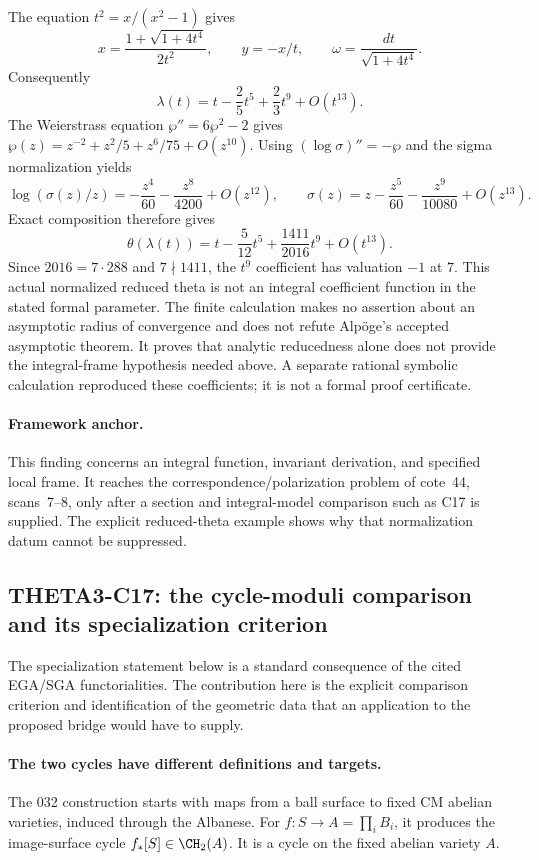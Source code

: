 \documentclass[11pt]{article}
\theoremstyle{definition}\newtheorem{definition}[theorem]{Definition}\newtheorem{remark}[theorem]{Remark}
\begin{document}
The equation $t^2=x/(x^2-1)$ gives
\[
 x=\frac{1+\sqrt{1+4t^4}}{2t^2},\qquad y=-x/t,
 \qquad \omega=\frac{dt}{\sqrt{1+4t^4}}.
\]
Consequently
\[
 \lambda(t)=t-\frac25t^5+\frac23t^9+O(t^{13}).
\]
The Weierstrass equation $\wp''=6\wp^2-2$ gives
$\wp(z)=z^{-2}+z^2/5+z^6/75+O(z^{10})$.
Using $(\log\sigma)''=-\wp$ and the sigma normalization yields
\[
 \log(\sigma(z)/z)=-\frac{z^4}{60}-\frac{z^8}{4200}+O(z^{12}),
 \qquad
 \sigma(z)=z-\frac{z^5}{60}-\frac{z^9}{10080}+O(z^{13}).
\]
Exact composition therefore gives
\[
 \theta(\lambda(t))
 =t-\frac5{12}t^5+\frac{1411}{2016}t^9+O(t^{13}).
\]
Since $2016=7\cdot288$ and $7\nmid1411$, the $t^9$ coefficient
has valuation $-1$ at $7$. This actual normalized reduced theta is
not an integral coefficient function in the stated formal
parameter. The finite calculation makes no assertion about an
asymptotic radius of convergence and does not refute Alp\"oge's
accepted asymptotic theorem. It proves that analytic reducedness
alone does not provide the integral-frame hypothesis needed above.
A separate rational symbolic calculation reproduced these
coefficients; it is not a formal proof certificate.

\paragraph{Framework anchor.}
This finding concerns an integral function, invariant derivation, and
specified local frame.  It reaches the correspondence/polarization
problem of cote~44, scans~7--8, only after a section and integral-model
comparison such as C17 is supplied.  The explicit reduced-theta example
shows why that normalization datum cannot be suppressed.

\subsection{THETA3-C17: the cycle-moduli comparison and its specialization criterion}
\label{C17}

The specialization statement below is a standard consequence of the cited
EGA/SGA functorialities.  The contribution here is the explicit comparison
criterion and identification of the geometric data that an application
to the proposed bridge would have to supply.

\paragraph{The two cycles have different definitions and targets.}
The 032 construction starts with maps from a ball surface to fixed
CM abelian varieties, induced through the Albanese. For
$f:S\to A=\prod_iB_i$, it produces the image-surface cycle
$f_*[S]\in\CH_2(A)$. It is a cycle on the fixed abelian variety
$A$.
\end{document}
